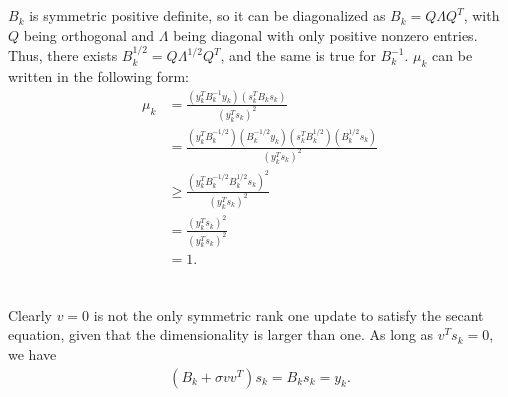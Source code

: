 \documentclass[11pt]{article}
\begin{document}
\maketitle
\section{}

\section{}
$B_k$ is symmetric positive definite, so it can be diagonalized as $B_k = Q\Lambda Q^T$, with $Q$ being orthogonal and $\Lambda$ being diagonal with only positive nonzero entries. Thus, there exists $B_k^{1/2} = Q\Lambda^{1/2}Q^T$, and the same is true for $B_k^{-1}$. $\mu_k$ can be written in the following form:
\begin{equation}\begin{split} 
\mu_k &= \frac{(y_k^TB_k^{-1}y_k)(s_k^TB_ks_k)}{(y_k^Ts_k)^2} \\
&= \frac{(y_k^TB_k^{-1/2})(B_k^{-1/2}y_k)(s_k^TB_k^{1/2})(B_k^{1/2}s_k)}{(y_k^Ts_k)^2}\\
&\geq\frac{(y_k^TB_k^{-1/2}B_k^{1/2}s_k)^2}{(y_k^Ts_k)^2} \\
&=\frac{(y_k^Ts_k)^2}{(y_k^Ts_k)^2}\\
&=1.
\end{split}\nonumber\end{equation} 

\section{}
\subsection{}
Clearly $v=0$ is not the only symmetric rank one update to satisfy the secant equation, given that the dimensionality is larger than one. As long as $v^Ts_k=0$, we have 
\begin{equation}\begin{split} 
(B_k+ \sigma vv^T)s_k = B_ks_k = y_k.
\end{split}\nonumber\end{equation} 
\end{document}

